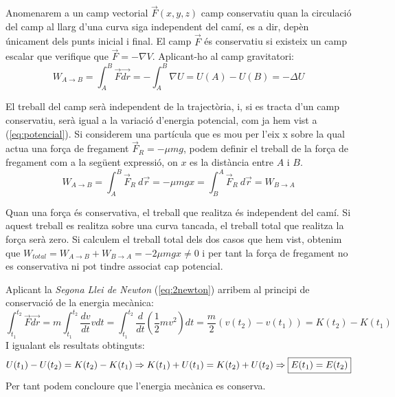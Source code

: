 \documentclass[11pt]{article}
\begin{document}
        \vspace{-0.2cm}Anomenarem a un camp vectorial $ \vec{F}(x,y,z)$ camp conservatiu quan la circulació del camp al llarg d'una curva siga independent del camí, es a dir, depèn únicament dels punts inicial i final. El camp $\vec{F}$ és conservatiu si existeix un camp escalar que verifique que $\vec{F}=-\nabla V$. Aplicant-ho al camp gravitatori:
        \vspace{-0.25cm}
        \begin{equation}
            W_{A\rightarrow B} = \int_A^B \vec{F}\vec{dr}=- \int_A^B \nabla U = U(A)-U(B)=-\Delta U
        \end{equation}
        
        El treball del camp serà independent de la trajectòria, i, si es tracta d'un camp conservatiu, serà igual a la variació d'energia potencial, com ja hem vist a (\ref{eq:potencial}). Si considerem una partícula que es mou per l'eix x sobre la qual actua una força de fregament $\vec{F}_R=-\mu mg$, podem definir el treball de la força de fregament com a la següent expressió, on $x$ es la distància entre $A$ i $B$.
        \vspace{-0.1cm}
        \begin{equation}
            W_{A\rightarrow B}=\int_A^B\vec{F}_R\ d\vec{r}=-\mu mgx=\int_B^A\vec{F}_R\ d\vec{r}=W_{B\rightarrow A}
        \end{equation}
        
        Quan una força és conservativa, el treball que realitza és independent del camí. Si aquest treball es realitza sobre una curva tancada, el treball total que realitza la força serà zero. Si calculem el treball total dels dos casos que hem vist, obtenim que $W_{total} = W_{A\rightarrow B}+W_{B\rightarrow A}=-2\mu mgx \neq 0$ i per tant la força de fregament no es conservativa ni pot tindre associat cap potencial.
        
        \vspace{0.3cm}Aplicant la \textit{Segona Llei de Newton} (\ref{eq:2newton}) arribem al principi de conservació de la energia mecànica:
        \begin{equation}
            \int_{t_1}^{t_2} \vec{F}\vec{dr} =m\int_{t_1}^{t_2}\frac{dv}{dt}vdt=\int_{t_1}^{t_2}\frac{d}{dt}\left(\frac{1}{2}mv^2\right)dt=\frac{m}{2}(v(t_2)-v(t_1))=K(t_2)-K(t_1)
        \end{equation}
        I igualant els resultats obtinguts:
        \begin{equation}
        \notag U(t_1)-U(t_2)= K(t_2)-K(t_1)\Rightarrow K(t_1)+U(t_1)=K(t_2)+U(t_2)\Rightarrow\boxed{{E(t_1)=E(t_2)}}
        \end{equation}
        Per tant podem concloure que l'energia mecànica es conserva.
\end{document}
